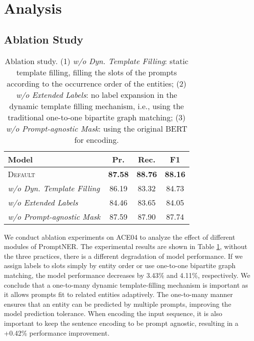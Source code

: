 \documentclass[11pt]{article}
\begin{document}
\section{Analysis}


\subsection{Ablation Study}


\begin{table}[]
    \centering
    \small
    \begin{tabular}{lccc}
    \toprule
    Model & Pr. & Rec. & F1\\
    \midrule
    \textsc{Default} &   \textbf{87.58} &  \textbf{88.76} &  \textbf{88.16} \\
    \midrule
    \quad \textit{w/o Dyn. Template Filling}  & 86.19 & 83.32 & 84.73 \\
    \quad \textit{w/o Extended Labels} & 84.46  &  83.65 & 84.05  \\
    \quad \textit{w/o Prompt-agnostic Mask} & 87.59 & 87.90 & 87.74\\
    \bottomrule
    \end{tabular}
    \caption{Ablation study. (1) \textit{w/o Dyn. Template Filling}: static template filling, filling the slots of the prompts according to the occurrence order of the entities; (2) \textit{w/o Extended Labels}: no label expansion in the dynamic template filling mechanism, i.e., using the traditional one-to-one bipartite graph matching; (3) \textit{w/o Prompt-agnostic Mask}: using the original BERT for encoding.}
    \label{tab:ablation}
\end{table}

We conduct ablation experiments on ACE04 to analyze the effect of different modules of PromptNER. The experimental results are shown in Table \ref{tab:ablation}, without the three practices, there is a different degradation of model performance.
If we assign labels to slots simply by entity order or use one-to-one bipartite graph matching, the model performance decreases by 3.43\% and 4.11\%, respectively.
We conclude that a one-to-many dynamic template-filling mechanism is important as it allows prompts fit to related entities adaptively. The one-to-many manner ensures that an entity can be predicted by multiple prompts, improving the model prediction tolerance. 
When encoding the input sequence, it is also important to keep the sentence encoding to be prompt agnostic, resulting in a +0.42\% performance improvement. 
\end{document}
